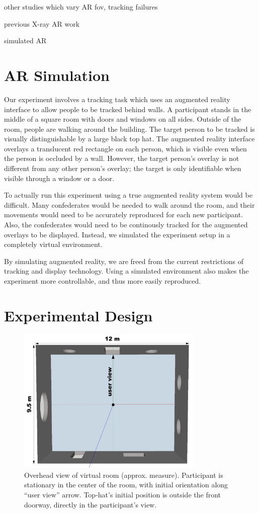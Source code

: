 \documentclass{acmsiggraph}                     %
\begin{document}
other studies which vary AR fov, tracking failures

previous X-ray AR work

simulated AR

\cite{4637329,4811058,1383060}

\section{AR Simulation}

Our experiment involves a tracking task which uses an augmented reality interface to allow people to be tracked behind walls.  A participant stands in the middle of a square room with doors and windows on all sides.  Outside of the room, people are walking around the building.  The target person to be tracked is visually distinguishable by a large black top hat.  The augmented reality interface overlays a translucent red rectangle on each person, which is visible even when the person is occluded by a wall.  However, the target person's overlay is not different from any other person's overlay; the target is only identifiable when visible through a window or a door.

To actually run this experiment using a true augmented reality system would be difficult.  Many confederates would be needed to walk around the room, and their movements would need to be accurately reproduced for each new participant.  Also, the confederates would need to be continously tracked for the augmented overlays to be displayed.  Instead, we simulated the experiment setup in a completely virtual environment.

By simulating augmented reality, we are freed from the current restrictions of tracking and display technology.  Using a simulated environment also makes the experiment more controllable, and thus more easily reproduced.

\section{Experimental Design}

\begin{figure}[ht!]
	\centering
	\includegraphics[width=3.5in]{figures/augmentedroom.png}
	\caption{Overhead view of virtual room (approx. measure).  Participant is stationary in the center of the room, with initial orientation along ``user view'' arrow.  Top-hat's initial position is outside the front doorway, directly in the participant's view.}
\end{figure}
\end{document}
